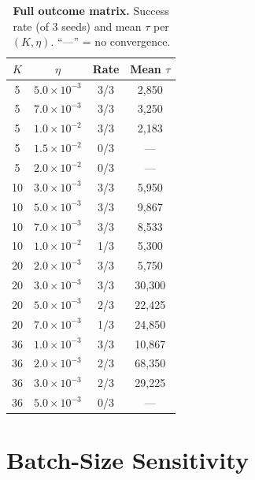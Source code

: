 \documentclass{article}
\begin{document}
\begin{table}[h]
\centering
\caption{\textbf{Full outcome matrix.} Success rate (of 3 seeds) and mean $\tau$ per $(K, \eta)$. ``---'' = no convergence.}
\label{tab:full-matrix}
\vspace{4pt}
\small
\begin{tabular}{@{}cccc@{}}
\toprule
$K$ & $\eta$ & Rate & Mean $\tau$ \\
\midrule
5  & $5.0 \times 10^{-3}$ & 3/3 & 2{,}850 \\
5  & $7.0 \times 10^{-3}$ & 3/3 & 3{,}250 \\
5  & $1.0 \times 10^{-2}$ & 3/3 & 2{,}183 \\
5  & $1.5 \times 10^{-2}$ & 0/3 & --- \\
5  & $2.0 \times 10^{-2}$ & 0/3 & --- \\
\midrule
10 & $3.0 \times 10^{-3}$ & 3/3 & 5{,}950 \\
10 & $5.0 \times 10^{-3}$ & 3/3 & 9{,}867 \\
10 & $7.0 \times 10^{-3}$ & 3/3 & 8{,}533 \\
10 & $1.0 \times 10^{-2}$ & 1/3 & 5{,}300 \\
\midrule
20 & $2.0 \times 10^{-3}$ & 3/3 & 5{,}750 \\
20 & $3.0 \times 10^{-3}$ & 3/3 & 30{,}300 \\
20 & $5.0 \times 10^{-3}$ & 2/3 & 22{,}425 \\
20 & $7.0 \times 10^{-3}$ & 1/3 & 24{,}850 \\
\midrule
36 & $1.0 \times 10^{-3}$ & 3/3 & 10{,}867 \\
36 & $2.0 \times 10^{-3}$ & 2/3 & 68{,}350 \\
36 & $3.0 \times 10^{-3}$ & 2/3 & 29{,}225 \\
36 & $5.0 \times 10^{-3}$ & 0/3 & --- \\
\bottomrule
\end{tabular}
\end{table}

\section{Batch-Size Sensitivity}
\label{app:batchsize}
\end{document}
